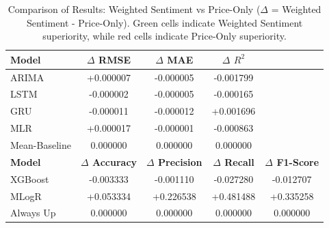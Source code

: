 \documentclass[Master,english,IEEE]{twbook}
\begin{document}
\begin{table}[H]
    \centering
    \small %
    \setlength{\tabcolsep}{4pt} %
    \begin{tabular}{|lcccc|}
        \hline
        \textbf{Model} & \textbf{$\Delta$ RMSE} & \textbf{$\Delta$ MAE} & \textbf{$\Delta$ $R^2$} & \\
        \hline
        ARIMA          & \cellcolor{red!50}+0.000007 & \cellcolor{green!50}-0.000005 & \cellcolor{red!50}-0.001799 & \\
        LSTM           & \cellcolor{green!50}-0.000002 & \cellcolor{green!50}-0.000005 & \cellcolor{red!50}-0.000165 & \\
        GRU            & \cellcolor{green!50}-0.000011 & \cellcolor{green!50}-0.000012 & \cellcolor{green!50}+0.001696 & \\
        MLR            & \cellcolor{red!50}+0.000017 & \cellcolor{green!50}-0.000001 & \cellcolor{red!50}-0.000863 & \\
        Mean-Baseline  & 0.000000                     & 0.000000                     & 0.000000                     & \\
        \hline
        \textbf{Model} & \textbf{$\Delta$ Accuracy} & \textbf{$\Delta$ Precision} & \textbf{$\Delta$ Recall} & \textbf{$\Delta$ F1-Score} \\
        \hline
        XGBoost        & \cellcolor{red!50}-0.003333 & \cellcolor{red!50}-0.001110 & \cellcolor{red!50}-0.027280 & \cellcolor{red!50}-0.012707 \\
        MLogR          & \cellcolor{green!50}+0.053334 & \cellcolor{green!50}+0.226538 & \cellcolor{green!50}+0.481488 & \cellcolor{green!50}+0.335258 \\
        Always Up      & 0.000000                     & 0.000000                     & 0.000000                     & 0.000000                     \\
        \hline
    \end{tabular}
    \caption{Comparison of Results: Weighted Sentiment vs Price-Only ($\Delta$ = Weighted Sentiment - Price-Only). Green cells indicate Weighted Sentiment superiority, while red cells indicate Price-Only superiority.}
    \label{tab:weighted_sentiment_vs_price_delta}
\end{table}
%
%
\clearpage
\printbibliography
\clearpage

\listoffigures
\clearpage

\listoftables
\clearpage
\end{document}
